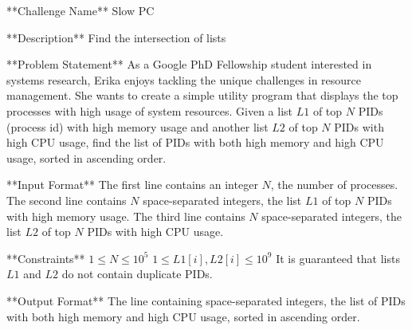 **Challenge Name**  
Slow PC

**Description**  
Find the intersection of lists

**Problem Statement**  
As a Google PhD Fellowship student interested in systems research, Erika enjoys tackling the unique challenges in resource management. She wants to create a simple utility program that displays the top processes with high usage of system resources.  
Given a list $L1$ of top $N$ PIDs (process id) with high memory usage and another list $L2$ of top $N$ PIDs with high CPU usage, find the list of PIDs with both high memory and high CPU usage, sorted in ascending order.

**Input Format**  
The first line contains an integer $N$, the number of processes.  
The second line contains $N$ space-separated integers, the list $L1$ of top $N$ PIDs with high memory usage.  
The third line contains $N$ space-separated integers, the list $L2$ of top $N$ PIDs with high CPU usage.  

**Constraints**  
$1 \leq N \leq 10^5$  
$1 \leq L1[i], L2[i] \leq 10^9$  
It is guaranteed that lists $L1$ and $L2$ do not contain duplicate PIDs.

**Output Format**  
The line containing space-separated integers, the list of PIDs with both high memory and high CPU usage, sorted in ascending order.